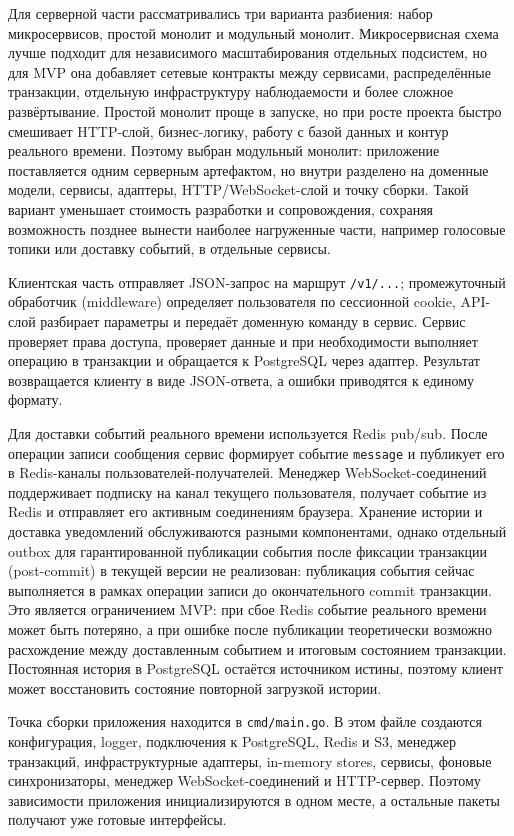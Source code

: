 \documentclass[a4paper,12pt]{extarticle}
\begin{document}
Для серверной части рассматривались три варианта разбиения: набор микросервисов, простой монолит и модульный монолит. Микросервисная схема лучше подходит для независимого масштабирования отдельных подсистем, но для MVP она добавляет сетевые контракты между сервисами, распределённые транзакции, отдельную инфраструктуру наблюдаемости и более сложное развёртывание. Простой монолит проще в запуске, но при росте проекта быстро смешивает HTTP-слой, бизнес-логику, работу с базой данных и контур реального времени. Поэтому выбран модульный монолит: приложение поставляется одним серверным артефактом, но внутри разделено на доменные модели, сервисы, адаптеры, HTTP/WebSocket-слой и точку сборки. Такой вариант уменьшает стоимость разработки и сопровождения, сохраняя возможность позднее вынести наиболее нагруженные части, например голосовые топики или доставку событий, в отдельные сервисы.

Клиентская часть отправляет JSON-запрос на маршрут \texttt{/v1/...}; промежуточный обработчик (middleware) определяет пользователя по сессионной cookie, API-слой разбирает параметры и передаёт доменную команду в сервис. Сервис проверяет права доступа, проверяет данные и при необходимости выполняет операцию в транзакции и обращается к PostgreSQL через адаптер. Результат возвращается клиенту в виде JSON-ответа, а ошибки приводятся к единому формату.

Для доставки событий реального времени используется Redis pub/sub. После операции записи сообщения сервис формирует событие \texttt{message} и публикует его в Redis-каналы пользователей-получателей. Менеджер WebSocket-соединений поддерживает подписку на канал текущего пользователя, получает событие из Redis и отправляет его активным соединениям браузера. Хранение истории и доставка уведомлений обслуживаются разными компонентами, однако отдельный outbox для гарантированной публикации события после фиксации транзакции (post-commit) в текущей версии не реализован: публикация события сейчас выполняется в рамках операции записи до окончательного commit транзакции. Это является ограничением MVP: при сбое Redis событие реального времени может быть потеряно, а при ошибке после публикации теоретически возможно расхождение между доставленным событием и итоговым состоянием транзакции. Постоянная история в PostgreSQL остаётся источником истины, поэтому клиент может восстановить состояние повторной загрузкой истории.

Точка сборки приложения находится в \texttt{cmd/main.go}. В этом файле создаются конфигурация, logger, подключения к PostgreSQL, Redis и S3, менеджер транзакций, инфраструктурные адаптеры, in-memory stores, сервисы, фоновые синхронизаторы, менеджер WebSocket-соединений и HTTP-сервер. Поэтому зависимости приложения инициализируются в одном месте, а остальные пакеты получают уже готовые интерфейсы.
\end{document}
